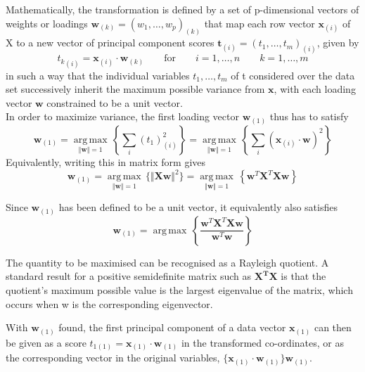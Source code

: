 \documentclass{mcmthesis}
\begin{document}
Mathematically, the transformation is defined by a set of p-dimensional vectors of weights or loadings $ \mathbf {w} _{(k)}=(w_{1},\dots ,w_{p})_{(k)}$ that map each row vector $\mathbf{x}_{(i)}$ of X to a new vector of principal component scores $ \mathbf {t} _{(i)}=(t_{1},\dots ,t_{m})_{(i)}$, given by
$$ {t_{k}}_{(i)}=\mathbf {x} _{(i)}\cdot \mathbf {w} _{(k)}\qquad \mathrm {for} \qquad i=1,\dots ,n\qquad k=1,\dots ,m$$
in such a way that the individual variables $ t_{1},\dots ,t_{m}$ of t considered over the data set successively inherit the maximum possible variance from $\mathbf {x}$, with each loading vector $\mathbf {w}$ constrained to be a unit vector. \\

In order to maximize variance, the first loading vector $\mathbf{w}_{(1)}$ thus has to satisfy
\begin{equation}
    \mathbf {w} _{(1)}={\underset {\Vert \mathbf {w} \Vert =1}{\operatorname {\arg \,max} }}\,\left\{\sum _{i}\left(t_{1}\right)_{(i)}^{2}\right\}={\underset {\Vert \mathbf {w} \Vert =1}{\operatorname {\arg \,max} }}\,\left\{\sum _{i}\left(\mathbf {x} _{(i)}\cdot \mathbf {w} \right)^{2}\right\}
\end{equation}
Equivalently, writing this in matrix form gives
\begin{equation}
    \mathbf {w} _{(1)}={\underset {\Vert \mathbf {w} \Vert =1}{\operatorname {\arg \,max} }}\,\{\Vert \mathbf {Xw} \Vert ^{2}\}={\underset {\Vert \mathbf {w} \Vert =1}{\operatorname {\arg \,max} }}\,\left\{\mathbf {w} ^{T}\mathbf {X} ^{T}\mathbf {Xw} \right\}
\end{equation} 

Since $\mathbf{w}_{(1)}$ has been defined to be a unit vector, it equivalently also satisfies
\begin{equation}
    \mathbf {w} _{(1)}={\operatorname {\arg \,max} }\,\left\{{\frac {\mathbf {w} ^{T}\mathbf {X} ^{T}\mathbf {Xw} }{\mathbf {w} ^{T}\mathbf {w} }}\right\}
\end{equation}

The quantity to be maximised can be recognised as a Rayleigh quotient. A standard result for a positive semidefinite matrix such as $\mathbf{X^TX}$ is that the quotient's maximum possible value is the largest eigenvalue of the matrix, which occurs when w is the corresponding eigenvector.

With $\mathbf{w}_{(1)}$ found, the first principal component of a data vector $\mathbf{x}_{(1)}$ can then be given as a score $t_{1(1)} = \mathbf{x}_{(1)} \cdot \mathbf{w}_{(1)}$ in the transformed co-ordinates, or as the corresponding vector in the original variables, $\{\mathbf{x}_{(1)} \cdot \mathbf{w}_{(1)}\} \mathbf{w}_{(1)}$. \\
\end{document}
